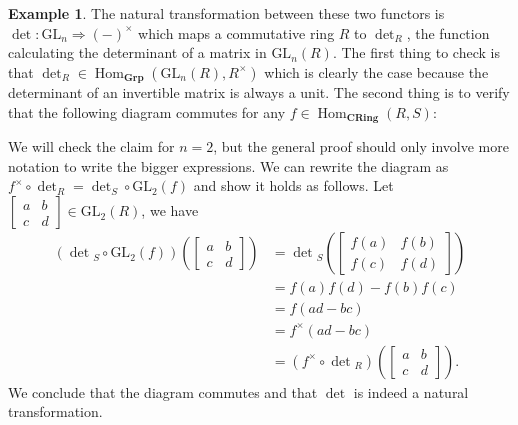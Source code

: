 \documentclass{scrartcl}
\theoremstyle{definition}
\newtheorem{exmp}[thm]{Example}
\theoremstyle{remark}
\DeclareMathOperator{\Hom}{Hom}
\newcommand{\gln}{\text{GL}_n}
\begin{document}
\begin{exmp}
The natural transformation between these two functors is $\det:\gln \Rightarrow (-)^{\times}$ which maps a commutative ring $R$ to $\det_R$, the function calculating the determinant of a matrix in $\gln(R)$. The first thing to check is that $\det_R \in \Hom_{\textbf{Grp}}(\gln(R), R^{\times})$ which is clearly the case because the determinant of an invertible matrix is always a unit. The second thing is to verify that the following diagram commutes for any $f\in \Hom_{\textbf{CRing}}(R,S)$:
\begin{figure}[H]
    \centering
\end{figure}
We will check the claim for $n=2$, but the general proof should only involve more notation to write the bigger expressions. We can rewrite the diagram as $f^{\times} \circ \det_R =  \det_S \circ \text{GL}_2(f)$ and show it holds as follows. Let $\begin{bmatrix}a&b\\c&d\end{bmatrix} \in \text{GL}_2(R)$, we have 
\begin{align*}
    (\det{}_S \circ \text{GL}_2(f))\left( \begin{bmatrix}a&b\\c&d\end{bmatrix} \right)&= 
    \det{}_S\left(\begin{bmatrix}f(a)&f(b)\\f(c)&f(d)\end{bmatrix}\right)\\
    &= f(a)f(d)-f(b)f(c)\\
    &= f(ad-bc)\\
    &= f^{\times}(ad-bc)\\
    &= (f^{\times}\circ \det{}_R)\left( \begin{bmatrix}a&b\\c&d\end{bmatrix}\right).
\end{align*}
We conclude that the diagram commutes and that $\det$ is indeed a natural transformation.
\end{exmp}
\end{document}
